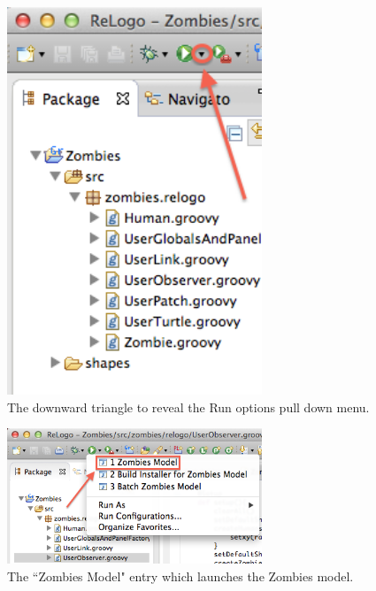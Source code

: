 \documentclass[11pt]{amsart}
\begin{document}
\begin{figure}
\begin{center}
\vspace{.2in}
\centerline {
\includegraphics[width=3in]{GettingStartedImages/RunButton.png}
}
\caption{The downward triangle to reveal the Run options pull down menu.}
\label{fig:runbutton}
\end{center}
\end{figure}

\begin{figure}
\begin{center}
\vspace{.2in}
\centerline {
\includegraphics[width=3in]{GettingStartedImages/RunZombies.png}
}
\caption{The ``Zombies Model" entry which launches the Zombies model.}
\label{fig:runzombies}
\end{center}
\end{figure}
\end{document}
